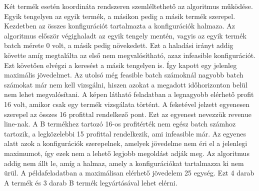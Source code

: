 Két termék esetén koordináta rendszeren szemléltethető az algoritmus működése.
Egyik tengelyen az egyik termék, a másikon pedig a másik termék szerepel.
Kezdetben az összes konfigurációt tartalmazta a konfigurációk halmaza.
Az algoritmus először végighaladt az egyik tengely mentén, vagyis az egyik termék batch mérete 0 volt, a másik pedig növekedett.
Ezt a haladási irányt addig követte amíg megtalálta az első nem megvalósítható, azaz infeasible konfigurációt.
Ezt követően elvégzi a keresést a másik tengelyen is.
Így kapott egy jelenleg maximális jövedelmet.
Az utolsó még feasible batch számoknál nagyobb batch számokat már nem kell vizsgálni, hiszen azokat a megadott időhorizonton belül nem lehet megvalósítani.
A képen látható feladatban a legnagyobb elérhető profit 16 volt, amikor csak egy termék vizsgálata történt.
A feketével jelzett egyenesen szerepel az összes 16 profittal rendelkező pont.
Ezt az egyenest nevezzük revenue line-nak.
A B termékhez tartozó 16-os profitérték nem egész batch számhoz tartozik, a legközelebbi 15 profittal rendelkezik, ami infeasible már.
Az egyenes alatt azok a konfigurációk szerepelnek, amelyek jövedelme nem éri el a jelenlegi maximumot, így ezek nem a lehető legjobb megoldást adják meg.
Az algoritmus addig nem állt le, amíg a halmaz, amely a konfigurációkat tartalmazza ki nem ürül.
A példafeladatban a maximálisan elérhető jövedelem 25 egység.
Ezt 4 darab A termék és 3 darab B termék legyártásával lehet elérni.